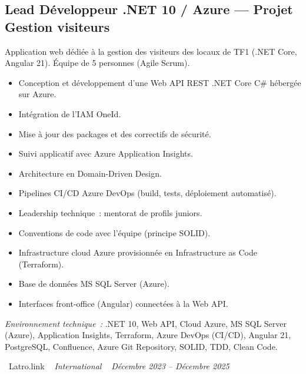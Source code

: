 \documentclass[10pt,a4paper]{article}
\begin{document}
\subsection*{Lead Développeur .NET 10 / Azure --- Projet Gestion visiteurs}
\color{darkgray}
Application web dédiée à la gestion des visiteurs des locaux de TF1 (.NET Core, Angular 21). Équipe de 5 personnes (Agile Scrum).
\begin{itemize}
  \item Conception et développement d'une Web API REST .NET Core C\# hébergée sur Azure.
  \item Intégration de l'IAM OneId.
  \item Mise à jour des packages et des correctifs de sécurité.
  \item Suivi applicatif avec Azure Application Insights.
  \item Architecture en Domain-Driven Design.
  \item Pipelines CI/CD Azure DevOps (build, tests, déploiement automatisé).
  \item Leadership technique~: mentorat de profils juniors.
  \item Conventions de code avec l'équipe (principe SOLID).
  \item Infrastructure cloud Azure provisionnée en Infrastructure as Code (Terraform).
  \item Base de données MS SQL Server (Azure).
  \item Interfaces front-office (Angular) connectées à la Web API.
\end{itemize}
\textit{Environnement technique~:} .NET 10, Web API, Cloud Azure, MS SQL Server (Azure), Application Insights, Terraform, Azure DevOps (CI/CD), Angular 21, PostgreSQL, Confluence, Azure Git Repository, SOLID, TDD, Clean Code.

\vspace{10pt}

\noindent\textcolor{primary}{ \faBuilding\ Latro.link} \quad
\textit{ \small \textcolor{darkgray}{ \faMapMarker\ } International } \hfill
\textit{ \small \textcolor{darkgray}{ \faCalendar\ } Décembre 2023 -- Décembre 2025 }

\vspace{4pt}
\end{document}
